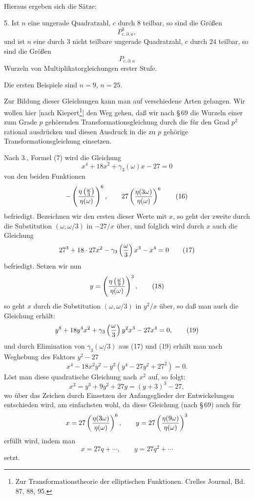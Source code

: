 \documentclass[11pt]{article}
\begin{document}
Hieraus ergeben sich die Sätze:

5. Ist $n$ eine ungerade Quadratzahl, $c$ durch $8$ teilbar, so sind die Größen
\[
 P_{c,\partial,a}^{3},
\]
und ist $n$ eine durch $3$ nicht teilbare ungerade Quadratzahl, $c$ durch $24$ teilbar, so sind die Größen
\[
 P_{c,\partial,a}
\]
Wurzeln von Multiplikatorgleichungen erster Stufe.

Die ersten Beispiele sind $n=9$, $n=25$.

Zur Bildung dieser Gleichungen kann man auf verschiedene Arten gelangen. Wir wollen hier [nach Kiepert\footnote{Zur Transformationstheorie der elliptischen Funktionen. Crelles Journal, Bd. 87, 88, 95.}] den Weg gehen, daß wir nach \S\,69 die Wurzeln einer zum Grade $p$ gehörenden Transformationsgleichung durch die für den Grad $p^2$ rational ausdrücken und diesen Ausdruck in die zu $p$ gehörige Transformationsgleichung einsetzen.

Nach 3., Formel (7) wird die Gleichung
\begin{equation}
 x^4+18x^2+\gamma_3(\omega)x-27=0
\tag{15}
\end{equation}
von den beiden Funktionen
\begin{equation}
 -\left({\eta\left({\omega\over3}\right)\over\eta(\omega)}\right)^6,
 \qquad
 27\left({\eta(3\omega)\over\eta(\omega)}\right)^6
\tag{16}
\end{equation}
befriedigt. Bezeichnen wir den ersten dieser Werte mit $x$, so geht der zweite durch die Substitution $(\omega,\omega/3)$ in $-27/x$ über, und folglich wird durch $x$ auch die Gleichung
\begin{equation}
 27^3+18\cdot27x^2-\gamma_3\left({\omega\over3}\right)x^3-x^4=0
\tag{17}
\end{equation}
befriedigt. Setzen wir nun
\begin{equation}
 y=\left({\eta\left({\omega\over9}\right)\over\eta(\omega)}\right)^3,
\tag{18}
\end{equation}
so geht $x$ durch die Substitution $(\omega,\omega/3)$ in $y^2/x$ über, so daß man auch die Gleichung erhält:
\begin{equation}
 y^8+18y^4x^2+\gamma_3\left({\omega\over3}\right)y^2x^3-27x^4=0,
\tag{19}
\end{equation}
und durch Elimination von $\gamma_3(\omega/3)$ aus (17) und (19) erhält man nach Weghebung des Faktors $y^2-27$
\begin{equation}
 x^4-18x^2y^2-y^2(y^4-27y^2+27^2)=0.
\tag{20}
\end{equation}
Löst man diese quadratische Gleichung nach $x^2$ auf, so folgt:
\begin{equation}
 x^2=y^3+9y^2+27y=(y+3)^3-27,
\tag{21}
\end{equation}
wo über das Zeichen durch Einsetzen der Anfangsglieder der Entwickelungen entschieden wird, am einfachsten wohl, da diese Gleichung (nach \S\,69) auch für
\[
 x=27\left({\eta(3\omega)\over\eta(\omega)}\right)^6,
 \qquad
 y=27\left({\eta(9\omega)\over\eta(\omega)}\right)^3
\]
erfüllt wird, indem man
\[
 x=27q+\cdots,
 \qquad
 y=27q^2+\cdots
\]
setzt.
\end{document}
